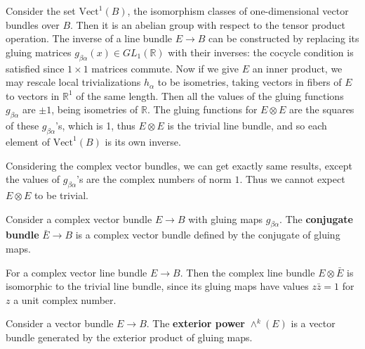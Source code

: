 \begin{exmp} Consider the set $\textrm{Vect}^1(B)$, the isomorphism classes of one-dimensional vector bundles over $B$. Then it is an abelian group with respect to the tensor product operation. The inverse of a line bundle $E\rightarrow B$ can be constructed by replacing its gluing matrices $g_{\beta\alpha}(x)\in GL_1(\mathbb{R})$ with their inverses: the cocycle condition is satisfied since $1\times 1$ matrices commute. Now if we give $E$ an inner product, we may rescale local trivializations $h_\alpha$ to be isometries, taking vectors in fibers of $E$ to vectors in $\mathbb{R}^1$ of the same length. Then all the values of the gluing functions $g_{\beta\alpha}$ are $\pm 1$, being isometries of $\mathbb{R}$. The gluing functions for $E\otimes E$ are the squares of these $g_{\beta\alpha}$'s, which is 1, thus $E\otimes E$ is the trivial line bundle, and so each element of $\textrm{Vect}^1(B)$ is its own inverse.

Considering the complex vector bundles, we can get exactly same results, except the values of $g_{\beta\alpha}$'s are the complex numbers of norm $1$. Thus we cannot expect $E\otimes E$ to be trivial.
\end{exmp}

\begin{defn} Consider a complex vector bundle $E\rightarrow B$ with gluing maps $g_{\beta\alpha}$. The \textbf{conjugate bundle} $\bar{E}\rightarrow B$ is a complex vector bundle defined by the conjugate of  gluing maps.
\end{defn}

\begin{exmp} For a complex vector line bundle $E\rightarrow B$. Then the complex line bundle $E\otimes \bar{E}$ is isomorphic to the trivial line bundle, since its gluing maps have values $z\bar{z}=1$ for $z$ a unit complex number.
\end{exmp}

\begin{defn} Consider a vector bundle $E\rightarrow B$. The \textbf{exterior power} $\wedge^k(E)$ is a vector bundle generated by the exterior product of gluing maps.
\end{defn}

